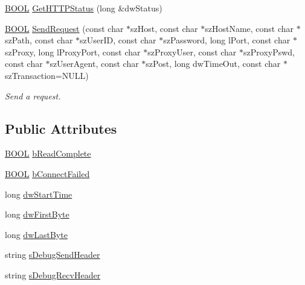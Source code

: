 \begin{DoxyCompactItemize}
\item 
\hyperlink{_cpclient_8h_a3be13892ae7076009afcf121347dd319}{\-B\-O\-O\-L} \hyperlink{class_c_h_t_t_p_client_a7562d00f8b4ab28fb1a457c3898c96b0}{\-Get\-H\-T\-T\-P\-Status} (long \&dw\-Status)
\item 
\hyperlink{_cpclient_8h_a3be13892ae7076009afcf121347dd319}{\-B\-O\-O\-L} \hyperlink{class_c_h_t_t_p_client_ac7c48dc326c9f3760d6edf34de812257}{\-Send\-Request} (const char $\ast$sz\-Host, const char $\ast$sz\-Host\-Name, const char $\ast$sz\-Path, const char $\ast$sz\-User\-I\-D, const char $\ast$sz\-Password, long l\-Port, const char $\ast$sz\-Proxy, long l\-Proxy\-Port, const char $\ast$sz\-Proxy\-User, const char $\ast$sz\-Proxy\-Pswd, const char $\ast$sz\-User\-Agent, const char $\ast$sz\-Post, long dw\-Time\-Out, const char $\ast$sz\-Transaction=\-N\-U\-L\-L)
\begin{DoxyCompactList}\small\item\em \-Send a request. \end{DoxyCompactList}\end{DoxyCompactItemize}
\subsection*{\-Public \-Attributes}
\begin{DoxyCompactItemize}
\item 
\hyperlink{_cpclient_8h_a3be13892ae7076009afcf121347dd319}{\-B\-O\-O\-L} \hyperlink{class_c_h_t_t_p_client_a9bb4f347e03b75be4adc9efe04ec1284}{b\-Read\-Complete}
\item 
\hyperlink{_cpclient_8h_a3be13892ae7076009afcf121347dd319}{\-B\-O\-O\-L} \hyperlink{class_c_h_t_t_p_client_a59e05bc90f7b71663e3b87c06c55721e}{b\-Connect\-Failed}
\item 
long \hyperlink{class_c_h_t_t_p_client_abaa4f1ce357ce53d5087281ad27c9c1b}{dw\-Start\-Time}
\item 
long \hyperlink{class_c_h_t_t_p_client_a88849e78a493edc3c349f3ada5ee86c2}{dw\-First\-Byte}
\item 
long \hyperlink{class_c_h_t_t_p_client_a7461aa9373197650c49ab680e6536d22}{dw\-Last\-Byte}
\item 
string \hyperlink{class_c_h_t_t_p_client_ae0232e77c7c396d7a6708139f6379ef7}{s\-Debug\-Send\-Header}
\item 
string \hyperlink{class_c_h_t_t_p_client_ad89f9c067334f868606ba6d00f3afdab}{s\-Debug\-Recv\-Header}
\end{DoxyCompactItemize}
